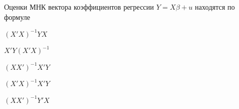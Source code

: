 
\begin{question}
Оценки МНК вектора коэффициентов регрессии \(Y=X\beta + u\)
находятся по формуле
\begin{answerlist}
  \item \((X'X)^{-1}YX\)
  \item \(X'Y(X'X)^{-1}\)
  \item \((XX')^{-1}X'Y\)
  \item \((X'X)^{-1}X'Y\)
  \item \((XX')^{-1}Y'X\)
\end{answerlist}
\end{question}


